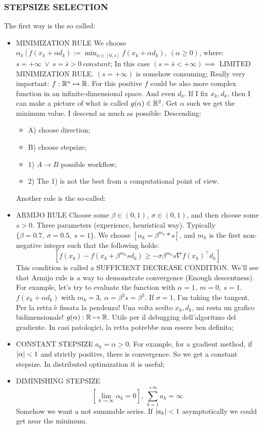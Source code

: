 \subsubsection{STEPSIZE SELECTION}

The first way is the so called:
\begin{itemize}
\item{MINIMIZATION RULE} We choose $\alpha_k\ |\ f(x_k+\alpha d_k) := \min_{\alpha\in[0,s]}{f(x_k+\alpha d_k)},\ (\alpha\geq 0)$, where: $s = +\infty\ \lor\ s=\bar{s}>0\ constant$;
In this case $(s=\bar{s}<+\infty) \implies$ LIMITED MINIMIZATION RULE. $(s=+\infty)$ is somehow consuming;
Really very important: $f:\mathbb{R}^n\mapsto\mathbb{R}$. For this positive $f$ could be also more complex function in an infinite-dimensional  space. And even $d_k$. If I fix $x_k,d_k$, then I can make a picture of what is called $g(\alpha)\in\mathbb{R}^2$. Get $\alpha$ such we get the minimum value. I descend as much as possible: Descending:
\begin{itemize}
\item{A)} choose direction;
\item{B)} choose stepsize;
\end{itemize}

\begin{itemize}
\item{1)} $A\rightarrow B$ possible workflow;
\item{2)} The 1) is not the best from a computational point of view.
\end{itemize}
Another rule is the so-called:
\item{ARMIJO RULE} Choose some $\beta\in(0,1),\ \sigma\in(0,1)$, and then choose some $s>0$. Three parameters (experience, heuristical way). Typically $\{\beta=0.7,\ \sigma=0.5,\ s=1\}$. We choose $[\alpha_k=\beta^{m_k}*s]$, and $m_k$ is the first non-negative integer such that the following holds:
\[
	[f(x_k)-f(x_k+\beta^{m_k}sd_k) \geq -\sigma\beta^{m_k}s\nabla{f(x_k)}^\top d_k]
\]
This condition is called a SUFFICIENT DECREASE CONDITION. We'll see that Armijo rule is a way to demonstrate convergence (Enough descentness).
For example, let's try to evaluate the function with $\alpha=1,\ m=0,\ s=1$. $f(x_k+\alpha d_k)$ with $m_k=3,\ \alpha=\beta^3s=\beta^3$. If $\sigma=1$, I'm taking the tangent. Per la retta è fissata la pendenza! Una volta scelto $x_k,d_k$, mi resta un grafico bidimensionale! $g(\alpha):\mathbb{R}\mapsto\mathbb{R}$. Utile per il debugging dell'algoritmo del gradiente. In casi patologici, la retta potrebbe non essere ben definita;

\item{CONSTANT STEPSIZE} $a_k=\underline{\alpha > 0}$. For example, for a gradient method, if $\lvert\alpha\rvert<1$ and strictly positive, there is convergence. So we get a constant stepsize. In distributed optimization it is useful;

\item{DIMINISHING STEPSIZE}
\[
	[\lim_{k\to\infty}{\alpha_k}=0],\ \sum_{k=1}^{+\infty}{a_k} = \infty
\]
Somehow we want a not summable series. If $\lvert a_k\rvert<1$ asymptotically we could get near the minimum.

\end{itemize}

